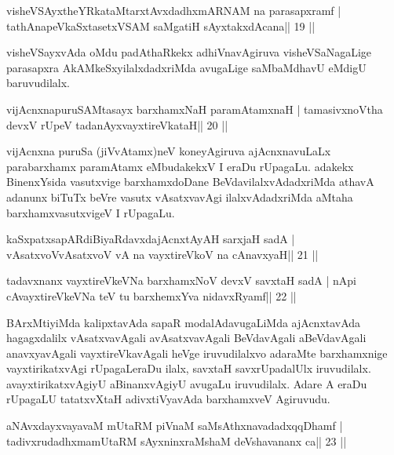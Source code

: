 \begin{shl}
visheVSAyxtheYRkataMtarxtAvxdadhxmARNAM na parasapxramf |
tathA\s napeVkaSxtasetxVSAM saMgatiH sAyxtakxdAcana\hfill || 19 ||
\end{shl}

\begin{artha}
visheVSayxvAda oMdu padAthaRkekx adhiVnavAgiruva visheVSaNagaLige parasapxra AkAMkeSxyilalxdadxriMda avugaLige saMbaMdhavU eMdigU baruvudilalx.
\end{artha}

\begin{shl}
vijAcnxnapuruSAMtasayx barxhamxNaH paramAtamxnaH |
tamasivxnoV\s tha devxV rUpeV tadanAyxvayxtireVkataH\hfill || 20 ||
\end{shl}

\begin{artha}
vijAcnxna puruSa (jiVvAtamx)neV koneyAgiruva ajAcnxnavuLaLx parabarxhamx paramAtamx eMbudakekxV I eraDu rUpagaLu. adakekx BinenxYsida vasutxvige barxhamxdoDane BeVdavilalxvAdadxriMda athavA adanunx biTuTx beVre vasutx vAsatxvavAgi ilalxvAdadxriMda aMtaha barxhamxvasutxvigeV I rUpagaLu.
\end{artha}



\begin{shl}
kaSxpatxsapARdiBiyaRdavxdajAcnxtAyAH sarxjaH sadA |
vAsatxvoV\s vAsatxvoV vA na vayxtireVkoV na cAnavxyaH\hfill || 21 ||
\end{shl}

\begin{shl}
tadavxnanx vayxtireVkeVNa barxhamxNoV devxV savxtaH sadA |
nApi cAvayxtireVkeVNa teV tu barxhemxYva nidavxRyamf\hfill || 22 ||
\end{shl}

\begin{artha}
BArxMtiyiMda kalipxtavAda sapaR modalAdavugaLiMda ajAcnxtavAda
hagagxdalilx vAsatxvavAgali avAsatxvavAgali BeVdavAgali aBeVdavAgali
anavxyavAgali vayxtireVkavAgali heVge iruvudilalxvo adaraMte
barxhamxnige vayxtirikatxvAgi rUpagaLeraDu ilalx, savxtaH savxrUpadalUlx
iruvudilalx. avayxtirikatxvAgiyU aBinanxvAgiyU avugaLu iruvudilalx.
Adare A eraDu rUpagaLU tatatxvXtaH adivxtiVyavAda barxhamxveV Agiruvudu.
\end{artha}



\begin{shl}
aNAvxdayxvayavaM mUtaRM piVnaM saMsAthxnavadadxqqDhamf |
tadivxrudadhxmamUtaRM sAyxninxraMshaM deVshavananx ca\hfill || 23 ||
\end{shl}

